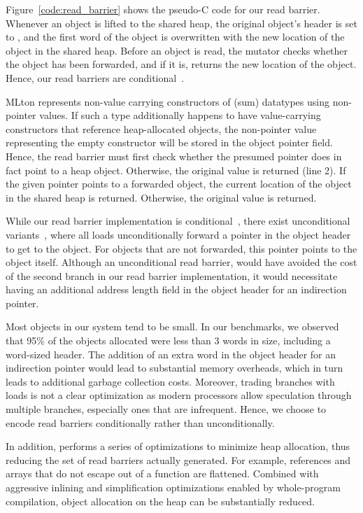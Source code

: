 Figure~\ref{code:read_barrier} shows the pseudo-C code for our read barrier.
Whenever an object is lifted to the shared heap, the original object's header
is set to , and the first word of the object is overwritten with
the new location of the object in the shared heap. Before an object is read,
the mutator checks whether the object has been forwarded, and if it is, returns
the new location of the object. Hence, our read barriers are
conditional~\cite{Blackburn04,Baker}.

MLton represents non-value carrying constructors of (sum) datatypes using
non-pointer values. If such a type additionally happens to have value-carrying
constructors that reference heap-allocated objects, the non-pointer value
representing the empty constructor will be stored in the object pointer field.
Hence, the read barrier must first check whether the presumed pointer does in
fact point to a heap object.  Otherwise, the original value is returned (line
2). If the given pointer points to a forwarded object, the current location of
the object in the shared heap is returned. Otherwise, the original value is
returned.

While our read barrier implementation is conditional~\cite{Baker}, there exist
unconditional variants~\cite{Brooks84}, where all loads unconditionally forward
a pointer in the object header to get to the object. For objects that are not
forwarded, this pointer points to the object itself. Although an unconditional
read barrier, would have avoided the cost of the second branch in our read
barrier implementation, it would necessitate having an additional address
length field in the object header for an indirection pointer.

Most objects in our system tend to be small. In our benchmarks, we observed
that 95\% of the objects allocated were less than 3 words in size, including a
word-sized header. The addition of an extra word in the object header for an
indirection pointer would lead to substantial memory overheads, which in turn
leads to additional garbage collection costs. Moreover, trading branches with
loads is not a clear optimization as modern processors allow speculation
through multiple branches, especially ones that are infrequent. Hence, we
choose to encode read barriers conditionally rather than unconditionally.

In addition, \MM performs a series of optimizations to minimize heap
allocation, thus reducing the set of read barriers actually generated.  For
example, references and arrays that do not escape out of a function are
flattened.  Combined with aggressive inlining and simplification optimizations
enabled by whole-program compilation, object allocation on the heap can be
substantially reduced.

